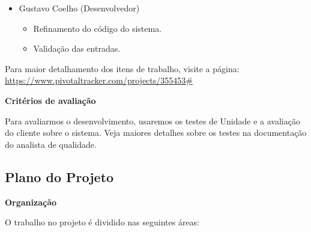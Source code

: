 \documentclass[12pt,letterpaper]{article}
\begin{document}
\begin{itemize}
\item {}Gustavo Coelho (Desenvolvedor)\\
\vspace{-0.5cm}
\begin{itemize}
\item{}Refinamento do código do sistema.\\
\item{}Validação das entradas.
\end{itemize}

\end{itemize}

\bigskip

Para maior detalhamento dos itens de trabalho, visite a página: 
\url{https://www.pivotaltracker.com/projects/355453#}

\vspace{1cm}
{\large {\bf Critérios de avaliação}}
\vspace{0.5cm}

Para avaliarmos o desenvolvimento, usaremos os testes de Unidade e a avaliação do cliente sobre o sistema.
Veja maiores detalhes sobre os testes na documentação do analista de qualidade.

\pagebreak

\subsection{Plano do Projeto}

\vspace{1cm}
{\large {\bf Organização}}
\vspace{0.5cm}

O trabalho no projeto é dividido nas seguintes áreas:
\end{document}
